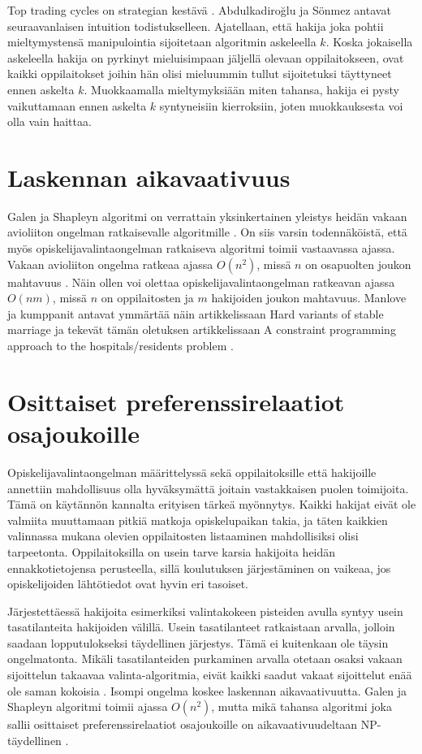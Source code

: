 \documentclass[gradu, twoside]{tktltiki}
\begin{document}
Top trading cycles on strategian kestävä \cite{abdusön03}.
Abdulkadiroğlu ja Sönmez antavat seuraavanlaisen intuition
todistukselleen. Ajatellaan, että hakija joka pohtii mieltymystensä
manipulointia sijoitetaan algoritmin askeleella $k$. Koska jokaisella
askeleella hakija on pyrkinyt mieluisimpaan jäljellä olevaan
oppilaitokseen, ovat kaikki oppilaitokset joihin hän olisi mieluummin
tullut sijoitetuksi täyttyneet ennen askelta $k$. Muokkaamalla
mieltymyksiään miten tahansa, hakija ei pysty vaikuttamaan ennen
askelta $k$ syntyneisiin kierroksiin, joten muokkauksesta voi olla
vain haittaa.

\section{Laskennan aikavaativuus}

Galen ja Shapleyn algoritmi on verrattain yksinkertainen yleistys
heidän vakaan avioliiton ongelman ratkaisevalle algoritmille
\cite{gusfield89}. On siis varsin todennäköistä, että myös
opiskelijavalintaongelman ratkaiseva algoritmi toimii vastaavassa
ajassa. Vakaan avioliiton ongelma ratkeaa ajassa $O(n^2)$, missä $n$
on osapuolten joukon mahtavuus \cite{gusfield89}. Näin ollen voi
olettaa opiskelijavalintaongelman ratkeavan ajassa $O(nm)$, missä $n$
on oppilaitosten ja $m$ hakijoiden joukon mahtavuus. Manlove ja
kumppanit antavat ymmärtää näin artikkelissaan Hard variants of stable
marriage \cite{manlove02} ja tekevät tämän oletuksen artikkelissaan A
constraint programming approach to the hospitals/residents problem
\cite{manlove07}.

\section{Osittaiset preferenssirelaatiot osajoukoille}

Opiskelijavalintaongelman määrittelyssä sekä oppilaitoksille että
hakijoille annettiin mahdollisuus olla hyväksymättä joitain
vastakkaisen puolen toimijoita. Tämä on käytännön kannalta erityisen
tärkeä myönnytys. Kaikki hakijat eivät ole valmiita muuttamaan pitkiä
matkoja opiskelupaikan takia, ja täten kaikkien valinnassa mukana
olevien oppilaitosten listaaminen mahdollisiksi olisi tarpeetonta.
Oppilaitoksilla on usein tarve karsia hakijoita heidän
ennakkotietojensa perusteella, sillä koulutuksen järjestäminen on
vaikeaa, jos opiskelijoiden lähtötiedot ovat hyvin eri tasoiset.

Järjestettäessä hakijoita esimerkiksi valintakokeen pisteiden avulla
syntyy usein tasatilanteita hakijoiden välillä. Usein tasatilanteet
ratkaistaan arvalla, jolloin saadaan lopputulokseksi täydellinen
järjestys. Tämä ei kuitenkaan ole täysin ongelmatonta. Mikäli
tasatilanteiden purkaminen arvalla otetaan osaksi vakaan sijoittelun
takaavaa valinta-algoritmia, eivät kaikki saadut vakaat sijoittelut
enää ole saman kokoisia \cite{manlove02}. Isompi ongelma koskee
laskennan aikavaativuutta. Galen ja Shapleyn algoritmi toimii ajassa
$O(n^2)$, mutta mikä tahansa algoritmi joka sallii osittaiset
preferenssirelaatiot osajoukoille on aikavaativuudeltaan
NP-täydellinen \cite{manlove02}.
\end{document}
